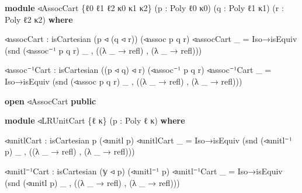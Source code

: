 \documentclass[
  11pt,
  oneside,
  article]{memoir}
\newenvironment{Shaded}{}{}
\newcommand{\KeywordTok}[1]{\textcolor[rgb]{0.00,0.44,0.13}{\textbf{#1}}}
\newcommand{\NormalTok}[1]{#1}
\newcommand{\OtherTok}[1]{\textcolor[rgb]{0.00,0.44,0.13}{#1}}
\theoremstyle{definition}
\theoremstyle{plain}
\newcommand{\0}{\textsf{0}}
\newcommand{\1}{\tn{\textsf{1}}}
\begin{document}
\begin{Shaded}
\begin{Highlighting}[]
\KeywordTok{module}\NormalTok{ ◃AssocCart }\OtherTok{\{}\NormalTok{ℓ0 ℓ1 ℓ2 κ0 κ1 κ2}\OtherTok{\}} \OtherTok{(}\NormalTok{p }\OtherTok{:}\NormalTok{ Poly ℓ0 κ0}\OtherTok{)} 
                  \OtherTok{(}\NormalTok{q }\OtherTok{:}\NormalTok{ Poly ℓ1 κ1}\OtherTok{)} \OtherTok{(}\NormalTok{r }\OtherTok{:}\NormalTok{ Poly ℓ2 κ2}\OtherTok{)} \KeywordTok{where}

\NormalTok{    ◃assocCart }\OtherTok{:}\NormalTok{ isCartesian }\OtherTok{(}\NormalTok{p ◃ }\OtherTok{(}\NormalTok{q ◃ r}\OtherTok{))} \OtherTok{(}\NormalTok{◃assoc p q r}\OtherTok{)}
\NormalTok{    ◃assocCart }\OtherTok{\_} \OtherTok{=} 
\NormalTok{        Iso→isEquiv }\OtherTok{(}\NormalTok{snd }\OtherTok{(}\NormalTok{◃assoc⁻¹ p q r}\OtherTok{)} \OtherTok{\_}\NormalTok{ , }\OtherTok{((λ} \OtherTok{\_} \OtherTok{→}\NormalTok{ refl}\OtherTok{)}\NormalTok{ , }\OtherTok{(λ} \OtherTok{\_} \OtherTok{→}\NormalTok{ refl}\OtherTok{)))}
    
\NormalTok{    ◃assoc⁻¹Cart }\OtherTok{:}\NormalTok{ isCartesian }\OtherTok{((}\NormalTok{p ◃ q}\OtherTok{)}\NormalTok{ ◃ r}\OtherTok{)} \OtherTok{(}\NormalTok{◃assoc⁻¹ p q r}\OtherTok{)}
\NormalTok{    ◃assoc⁻¹Cart }\OtherTok{\_} \OtherTok{=} 
\NormalTok{        Iso→isEquiv }\OtherTok{(}\NormalTok{snd }\OtherTok{(}\NormalTok{◃assoc p q r}\OtherTok{)} \OtherTok{\_}\NormalTok{ , }\OtherTok{((λ} \OtherTok{\_} \OtherTok{→}\NormalTok{ refl}\OtherTok{)}\NormalTok{ , }\OtherTok{(λ} \OtherTok{\_} \OtherTok{→}\NormalTok{ refl}\OtherTok{)))}

\KeywordTok{open}\NormalTok{ ◃AssocCart }\KeywordTok{public}

\KeywordTok{module}\NormalTok{ ◃LRUnitCart }\OtherTok{\{}\NormalTok{ℓ κ}\OtherTok{\}} \OtherTok{(}\NormalTok{p }\OtherTok{:}\NormalTok{ Poly ℓ κ}\OtherTok{)} \KeywordTok{where}

\NormalTok{    ◃unitlCart }\OtherTok{:}\NormalTok{ isCartesian p }\OtherTok{(}\NormalTok{◃unitl p}\OtherTok{)}
\NormalTok{    ◃unitlCart }\OtherTok{\_} \OtherTok{=}\NormalTok{ Iso→isEquiv }\OtherTok{(}\NormalTok{snd }\OtherTok{(}\NormalTok{◃unitl⁻¹ p}\OtherTok{)} \OtherTok{\_}\NormalTok{ , }\OtherTok{((λ} \OtherTok{\_} \OtherTok{→}\NormalTok{ refl}\OtherTok{)}\NormalTok{ , }\OtherTok{(λ} \OtherTok{\_} \OtherTok{→}\NormalTok{ refl}\OtherTok{)))}

\NormalTok{    ◃unitl⁻¹Cart }\OtherTok{:}\NormalTok{ isCartesian }\OtherTok{(}\NormalTok{𝕪 ◃ p}\OtherTok{)} \OtherTok{(}\NormalTok{◃unitl⁻¹ p}\OtherTok{)}
\NormalTok{    ◃unitl⁻¹Cart }\OtherTok{\_} \OtherTok{=}\NormalTok{ Iso→isEquiv }\OtherTok{(}\NormalTok{snd }\OtherTok{(}\NormalTok{◃unitl p}\OtherTok{)} \OtherTok{\_}\NormalTok{ , }\OtherTok{((λ} \OtherTok{\_} \OtherTok{→}\NormalTok{ refl}\OtherTok{)}\NormalTok{ , }\OtherTok{(λ} \OtherTok{\_} \OtherTok{→}\NormalTok{ refl}\OtherTok{)))}


\end{Highlighting}
\end{Shaded}
\end{document}
